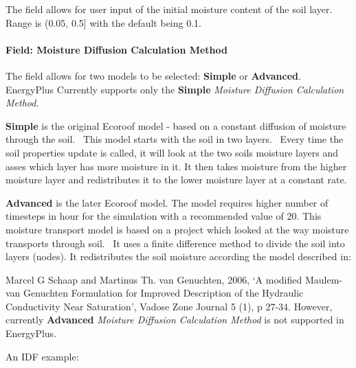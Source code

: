 The field allows for user input of the initial moisture content of the soil layer. Range is (0.05, 0.5{]} with the default being 0.1.

\paragraph{Field: Moisture Diffusion Calculation Method}\label{field-moisture-diffusion-calculation-method}

The field allows for two models to be selected: \textbf{Simple} or \textbf{Advanced}. EnergyPlus Currently supports only the \textbf{Simple} \textit{Moisture Diffusion Calculation Method}.

\textbf{Simple} is the original Ecoroof model - based on a constant diffusion of moisture through the soil.~ This model starts with the soil in two layers.~ Every time the soil properties update is called, it will look at the two soils moisture layers and asses which layer has more moisture in it. It then takes moisture from the higher moisture layer and redistributes it to the lower moisture layer at a constant rate.

\textbf{Advanced} is the later Ecoroof model. The model requires higher number of timesteps in hour for the simulation with a recommended value of 20. This moisture transport model is based on a project which looked at the way moisture transports through soil.~ It uses a finite difference method to divide the soil into layers (nodes). It redistributes the soil moisture according the model described in:

Marcel G Schaap and Martinus Th. van Genuchten, 2006, `A modified Maulem-van Genuchten Formulation for Improved Description of the Hydraulic Conductivity Near Saturation', Vadose Zone Journal 5 (1), p 27-34. However, currently \textbf{Advanced} \textit{Moisture Diffusion Calculation Method} is not supported in EnergyPlus.

An IDF example:

